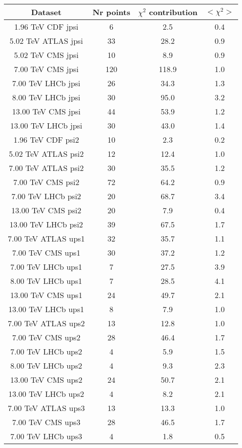 \begin{table}[h!]
\centering
\begin{tabular}{c|c|c|c}
Dataset & Nr points & $\chi^2$ contribution & $<\chi^2>$ \\
\hline
1.96 TeV CDF jpsi & 6 & 2.5 & 0.4 \\
5.02 TeV ATLAS jpsi & 33 & 28.2 & 0.9 \\
5.02 TeV CMS jpsi & 10 & 8.9 & 0.9 \\
7.00 TeV CMS jpsi & 120 & 118.9 & 1.0 \\
7.00 TeV LHCb jpsi & 26 & 34.3 & 1.3 \\
8.00 TeV LHCb jpsi & 30 & 95.0 & 3.2 \\
13.00 TeV CMS jpsi & 44 & 53.9 & 1.2 \\
13.00 TeV LHCb jpsi & 30 & 43.0 & 1.4 \\
1.96 TeV CDF psi2 & 10 & 2.3 & 0.2 \\
5.02 TeV ATLAS psi2 & 12 & 12.4 & 1.0 \\
7.00 TeV ATLAS psi2 & 30 & 35.5 & 1.2 \\
7.00 TeV CMS psi2 & 72 & 64.2 & 0.9 \\
7.00 TeV LHCb psi2 & 20 & 68.7 & 3.4 \\
13.00 TeV CMS psi2 & 20 & 7.9 & 0.4 \\
13.00 TeV LHCb psi2 & 39 & 67.5 & 1.7 \\
7.00 TeV ATLAS ups1 & 32 & 35.7 & 1.1 \\
7.00 TeV CMS ups1 & 30 & 37.2 & 1.2 \\
7.00 TeV LHCb ups1 & 7 & 27.5 & 3.9 \\
8.00 TeV LHCb ups1 & 7 & 28.5 & 4.1 \\
13.00 TeV CMS ups1 & 24 & 49.7 & 2.1 \\
13.00 TeV LHCb ups1 & 8 & 7.9 & 1.0 \\
7.00 TeV ATLAS ups2 & 13 & 12.8 & 1.0 \\
7.00 TeV CMS ups2 & 28 & 46.4 & 1.7 \\
7.00 TeV LHCb ups2 & 4 & 5.9 & 1.5 \\
8.00 TeV LHCb ups2 & 4 & 9.3 & 2.3 \\
13.00 TeV CMS ups2 & 24 & 50.7 & 2.1 \\
13.00 TeV LHCb ups2 & 4 & 8.2 & 2.1 \\
7.00 TeV ATLAS ups3 & 13 & 13.3 & 1.0 \\
7.00 TeV CMS ups3 & 28 & 46.5 & 1.7 \\
7.00 TeV LHCb ups3 & 4 & 1.8 & 0.5 \\

\end{tabular}
\end{table}
